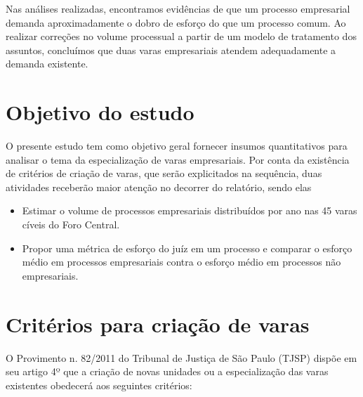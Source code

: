 \documentclass[]{book}
\providecommand{\tightlist}{%
  \setlength{\itemsep}{0pt}\setlength{\parskip}{0pt}}
\begin{document}
Nas análises realizadas, encontramos evidências de que um processo
empresarial demanda aproximadamente o dobro de esforço do que um
processo comum. Ao realizar correções no volume processual a partir de
um modelo de tratamento dos assuntos, concluímos que duas varas
empresariais atendem adequadamente a demanda existente.

\section{Objetivo do estudo}\label{objetivo-do-estudo}

O presente estudo tem como objetivo geral fornecer insumos quantitativos
para analisar o tema da especialização de varas empresariais. Por conta
da existência de critérios de criação de varas, que serão explicitados
na sequência, duas atividades receberão maior atenção no decorrer do
relatório, sendo elas

\begin{itemize}
\tightlist
\item
  Estimar o volume de processos empresariais distribuídos por ano nas 45
  varas cíveis do Foro Central.
\item
  Propor uma métrica de esforço do juíz em um processo e comparar o
  esforço médio em processos empresariais contra o esforço médio em
  processos não empresariais.
\end{itemize}

\section{Critérios para criação de
varas}\label{criterios-para-criacao-de-varas}

O Provimento n. 82/2011 do Tribunal de Justiça de São Paulo (TJSP)
dispõe em seu artigo 4º que a criação de novas unidades ou a
especialização das varas existentes obedecerá aos seguintes critérios:
\end{document}
